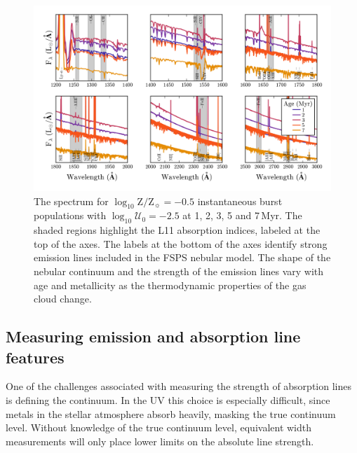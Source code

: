 \documentclass[preprint2,trackchanges]{aastex62}
\newcommand{\FSPS}{{\sc FSPS}\xspace}
\newcommand{\Myr}{$\,$Myr\xspace}
\newcommand{\logten}{\ensuremath{\log_{10}}}
\newcommand{\logZeq}[1]{\ensuremath{\logten \mathrm{Z}/\mathrm{Z}_{\sun} = #1}}
\newcommand{\logUeq}[1]{\ensuremath{\logten \mathcal{U}_0 = #1}}
\begin{document}
\begin{figure}
  \begin{center}
    \includegraphics[width=\linewidth]{figs/f2.png}
    \caption{The spectrum for \logZeq{-0.5} instantaneous burst populations with \logUeq{-2.5} at 1, 2, 3, 5 and 7\Myr. The shaded regions highlight the L11 absorption indices, labeled at the top of the axes. The labels at the bottom of the axes identify strong emission lines included in the \FSPS nebular model. The shape of the nebular continuum and the strength of the emission lines vary with age and metallicity as the thermodynamic properties of the gas cloud change.}
    \label{fig:FullSpecAge}
  \end{center}
\end{figure}


\subsection{Measuring emission and absorption line features}\label{sec:mod:meas}

One of the challenges associated with measuring the strength of absorption lines is defining the continuum. In the UV this choice is especially difficult, since metals in the stellar atmosphere absorb heavily, masking the true continuum level. Without knowledge of the true continuum level, equivalent width measurements will only place lower limits on the absolute line strength. 
\end{document}
